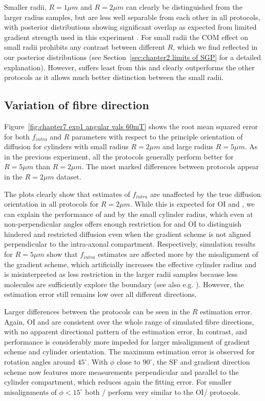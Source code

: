 Smaller radii, $R=1\mu m$ and $R=2\mu m$ can clearly be distinguished from the larger radius samples, but are less well separable from each other in all protocols, with posterior distributions showing significant overlap as expected from limited gradient strength used in this experiment \citep{Alexander:2008,Alexander:2010,Siow:2012}. For small radii the \gls{COM} effect on small radii prohibits any contrast between different $R$, which we find reflected in our posterior distributions  (see Section~\ref{sec:chapter2 limits of SGP} for a detailed explanation). However, {\FD} suffers least from this and clearly outperforms the other protocols as it allows much better distinction between the small radii.


\subsection{Variation of fibre direction}
Figure~\ref{fig:chapter7 exp1 angular vals 60mT} shows the root mean squared error for both $f_{intra}$ and $R$ parameters with respect to the principle orientation of diffusion for cylinders with small radius $R=2\mu m$ and large radius $R=5\mu m$. As in the previous experiment, all the protocols generally perform better for $R=5\mu m$ than $R=2\mu m$. The most marked differences between protocols appear in the $R=2\mu m$ dataset.


The plots clearly show that estimates of $f_{intra}$ are unaffected by the true diffusion orientation in all protocols for $R=2\mu m$. While this is expected for {\gls{OI}} and {\SD}, we can explain the performance of {\FD} and {\DO} by the small cylinder radius, which even at non-perpendicular angles offers enough restriction for {\FD} and {\gls{OI}} to distinguish hindered and restricted diffusion even when the gradient scheme is not aligned perpendicular to the intra-axonal compartment. Respectively, simulation results for $R=5\mu m$ show that $f_{intra}$ estimates are affected more by the misalignment of the gradient scheme, which artificially increases the effective cylinder radius and is misinterpreted as less restriction in the larger radii samples because less molecules are sufficiently explore the boundary (see also e.g. \citep{Avram:2004,Zhang:2011}). However, the estimation error still remains low over all different directions.


Larger differences between the protocols can be seen in the $R$ estimation error. Again, {\gls{OI}} and {\SD} are consistent over the whole range of simulated fibre directions, with no apparent directional pattern of the estimation error. In contrast, {\FD} and {\DO} performance is considerably more impeded for larger misalignment of gradient scheme and cylinder orientation. The maximum estimation error is observed for rotation angles around $45^\circ$. With $\phi$ close to $90^\circ$, the {\gls{SF}} and {\DO} gradient direction scheme now features more measurements perpendicular and parallel to the cylinder compartment, which reduces again the fitting error. For smaller misalignments of $\phi<15^\circ$ both {\FD}/{\DO} perform very similar to the {\gls{OI}}/{\SD} protocols.

